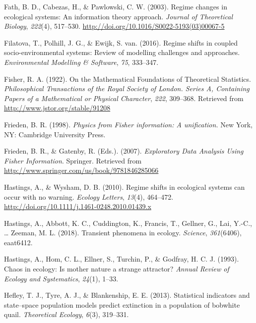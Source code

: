\documentclass[12pt,twoside,openany]{reedthesis}
\begin{document}
\hypertarget{ref-fath_regime_2003}{}
Fath, B. D., Cabezas, H., \& Pawlowski, C. W. (2003). Regime changes in
ecological systems: An information theory approach. \emph{Journal of
Theoretical Biology}, \emph{222}(4), 517--530.
\url{http://doi.org/10.1016/S0022-5193(03)00067-5}

\hypertarget{ref-filatova2016regime}{}
Filatova, T., Polhill, J. G., \& Ewijk, S. van. (2016). Regime shifts in
coupled socio-environmental systems: Review of modelling challenges and
approaches. \emph{Environmental Modelling \& Software}, \emph{75},
333--347.

\hypertarget{ref-fisher_mathematical_1922}{}
Fisher, R. A. (1922). On the Mathematical Foundations of Theoretical
Statistics. \emph{Philosophical Transactions of the Royal Society of
London. Series A, Containing Papers of a Mathematical or Physical
Character}, \emph{222}, 309--368. Retrieved from
\url{http://www.jstor.org/stable/91208}

\hypertarget{ref-frieden_physics_1998}{}
Frieden, B. R. (1998). \emph{Physics from Fisher information: A
unification.} New York, NY: Cambridge University Press.

\hypertarget{ref-frieden_exploratory_2007}{}
Frieden, B. R., \& Gatenby, R. (Eds.). (2007). \emph{Exploratory Data
Analysis Using Fisher Information}. Springer. Retrieved from
\url{http://www.springer.com/us/book/9781846285066}

\hypertarget{ref-hastings_regime_2010}{}
Hastings, A., \& Wysham, D. B. (2010). Regime shifts in ecological
systems can occur with no warning. \emph{Ecology Letters}, \emph{13}(4),
464--472. \url{http://doi.org/10.1111/j.1461-0248.2010.01439.x}

\hypertarget{ref-hastings2018transient}{}
Hastings, A., Abbott, K. C., Cuddington, K., Francis, T., Gellner, G.,
Lai, Y.-C., \ldots{} Zeeman, M. L. (2018). Transient phenomena in
ecology. \emph{Science}, \emph{361}(6406), eaat6412.

\hypertarget{ref-hastings1993chaos}{}
Hastings, A., Hom, C. L., Ellner, S., Turchin, P., \& Godfray, H. C. J.
(1993). Chaos in ecology: Is mother nature a strange attractor?
\emph{Annual Review of Ecology and Systematics}, \emph{24}(1), 1--33.

\hypertarget{ref-hefley2013statistical}{}
Hefley, T. J., Tyre, A. J., \& Blankenship, E. E. (2013). Statistical
indicators and state--space population models predict extinction in a
population of bobwhite quail. \emph{Theoretical Ecology}, \emph{6}(3),
319--331.
\end{document}
